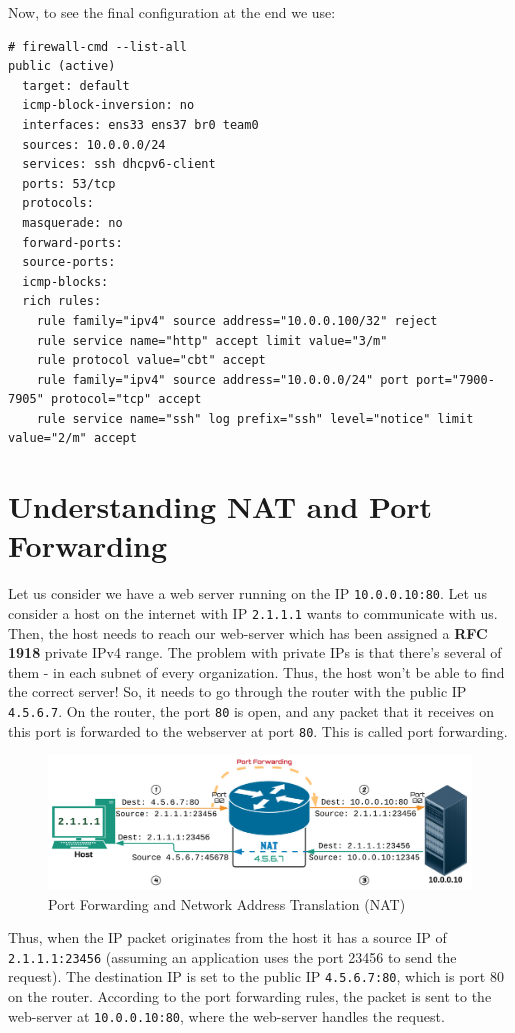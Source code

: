 \noindent
Now, to see the final configuration at the end we use:

\vspace{-15pt}
\begin{verbatim}
# firewall-cmd --list-all
public (active)
  target: default
  icmp-block-inversion: no
  interfaces: ens33 ens37 br0 team0
  sources: 10.0.0.0/24
  services: ssh dhcpv6-client
  ports: 53/tcp
  protocols: 
  masquerade: no
  forward-ports: 
  source-ports: 
  icmp-blocks: 
  rich rules: 
	rule family="ipv4" source address="10.0.0.100/32" reject
	rule service name="http" accept limit value="3/m"
	rule protocol value="cbt" accept
	rule family="ipv4" source address="10.0.0.0/24" port port="7900-7905" protocol="tcp" accept
	rule service name="ssh" log prefix="ssh" level="notice" limit value="2/m" accept
\end{verbatim}

\section{Understanding NAT and Port Forwarding}
Let us consider we have a web server running on the IP \verb|10.0.0.10:80|. Let us consider a host on the internet with IP \verb|2.1.1.1| wants to communicate with us. Then, the host needs to reach our web-server which has been assigned a \textbf{RFC 1918} private IPv4 range. The problem with private IPs is that there's several of them - in each subnet of every organization. Thus, the host won't be able to find the correct server! So, it needs to go through the router with the public IP \verb|4.5.6.7|. On the router, the port \verb|80| is open, and any packet that it receives on this port is forwarded to the webserver at port \verb|80|. This is called port forwarding.

\begin{figure}[H]
	\centering
	\includegraphics[width=\linewidth]{Mod2/chapters/2.7.a}
	\caption{Port Forwarding and Network Address Translation (NAT)}
	\label{fig:2}
\end{figure}

Thus, when the IP packet originates from the host it has a source IP of \verb|2.1.1.1:23456| (assuming an application uses the port 23456 to send the request). The destination IP is set to the public IP \verb|4.5.6.7:80|, which is port 80 on the router. According to the port forwarding rules, the packet is sent to the web-server at \verb|10.0.0.10:80|, where the web-server handles the request. 

